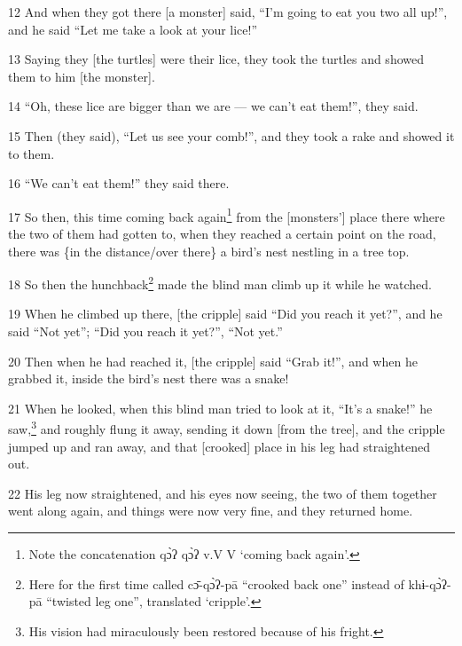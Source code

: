 12 And when they got there [a monster] said, ``I'm going to eat you two all up!'',
and he said ``Let me take a look at your lice!''

13 Saying they [the turtles] were their lice, they took the turtles and showed
them to him [the monster].

14 ``Oh, these lice are bigger than we are --- we can't eat them!'', they said.

15 Then (they said), ``Let us see your comb!'', and they took a rake and showed
it to them.

16 ``We can't eat them!'' they said there.

17 So then, this time coming back again\footnote{Note the concatenation qɔ̀ʔ qɔ̀ʔ v.V V `coming back again'.} from the [monsters'] place there where
the two of them had gotten to, when they reached a certain point on the road, there
was \{in the distance/over there\} a bird's nest nestling in a tree top.

18 So then the hunchback\footnote{Here for the first time called cɔ̄-qɔ̀ʔ-pā ``crooked back one'' instead of khɨ-qɔ̀ʔ-pā ``twisted leg one'', translated `cripple'.} made the blind man climb up it while he watched.

19 When he climbed up there, [the cripple] said ``Did you reach it yet?'', and
he said ``Not yet''; ``Did you reach it yet?'', ``Not yet.''

20 Then when he had reached it, [the cripple] said ``Grab it!'', and when he grabbed
it, inside the bird's nest there was a snake!

21 When he looked, when this blind man tried to look at it, ``It's a snake!'' he
saw,\footnote{His vision had miraculously been restored because of his fright.} and roughly flung it away, sending it down [from the tree], and the cripple
jumped up and ran away, and that [crooked] place in his leg had straightened out.

22 His leg now straightened, and his eyes now seeing, the two of them together
went along again, and things were now very fine, and they returned home.

